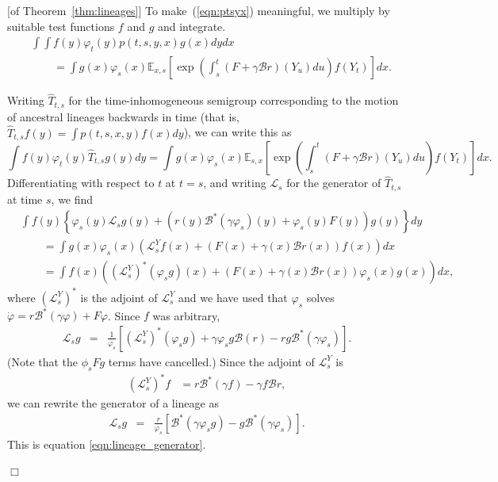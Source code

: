 \documentclass[12pt]{article}
\newenvironment {proof}{{\noindent\bf Proof }}{\hfill $\Box$ \medskip}
\def \hat{\widehat}
\newcommand{\IE}{\mathbb E}
\newcommand{\DG}{\mathcal{B}}  %
\newcommand{\Lgen}{\mathcal{L}}    %
\begin{document}
\begin{proof}[of Theorem~\ref{thm:lineages}]
To make~(\ref{eqn:ptsyx}) meaningful, we multiply by suitable test functions
$f$ and $g$ and integrate.
\begin{align*}
&\int \int f(y) \varphi_t(y) p(t,s,y,x) g(x) dy dx \\
&\qquad =
\int g(x) \varphi_s(x)
\IE_{x,s}\left[
    \exp\left(
        \int_s^t(F+\gamma\DG r)(Y_u)du
    \right)f(Y_t)
\right] dx .
\end{align*}

Writing $\hat{T}_{t,s}$ for the time-inhomogeneous semigroup
corresponding to the motion of ancestral lineages backwards in time
(that is, $\hat{T}_{t,s} f(y) = \int p(t,s,x,y) f(x) dy$),
we can write this as 
$$
    \int f(y)\varphi_t(y)\hat{T}_{t,s}g(y)dy
    =
    \int g(x) \varphi_s(x)
        \IE_{s,x} \left[
            \exp\left(
                \int_s^t(F+\gamma\DG r)(Y_u)du
            \right)f(Y_t)
        \right]dx.
$$
Differentiating with respect to $t$ at $t=s$, and writing 
$\Lgen_s$ for the generator of $\hat{T}_{t,s}$ at time $s$, we find
\begin{align*}
&
    \int f(y) \left\{
        \varphi_s(y) \Lgen_s g(y)
        + \left(
            r(y) \DG^*(\gamma \varphi_s)(y) + \varphi_s(y) F(y)
        \right) g(y)
    \right\} dy \\
&\qquad =
    \int g(x) \varphi_s(x) \left(
        {\mathcal L}^Y_s f(x) + (F(x)+\gamma(x) \DG r(x)) f(x)
    \right) dx \\
&\qquad =
    \int f(x) \left(
        ({\mathcal L}^Y_s)^* (\varphi_s g)(x) + (F(x) + \gamma(x) \DG r(x)) \varphi_s(x) g(x)
    \right) dx ,
\end{align*}
where $({\mathcal L}^Y_s)^*$ is the adjoint of ${\mathcal L}^Y_s$
and we have used that $\varphi_s$ solves $\dot \varphi = r \DG^*(\gamma \varphi) + F \varphi$.
Since $f$ was arbitrary,
\begin{eqnarray*}
\Lgen_s g
    &=&
    \frac{1}{\varphi_s} \left[
        ({\mathcal L}^Y_s)^* (\varphi_s g)
        + \gamma \varphi_s g \DG(r)
        - r g \DG^*(\gamma \varphi_s)
    \right] .
\end{eqnarray*}
(Note that the $\phi_s F g$ terms have cancelled.)
Since the adjoint of ${\mathcal L}^Y_s$ is
\begin{align*}
    ({\mathcal L}^Y_s)^* f
    &=
    r \DG^* (\gamma f) - \gamma f \DG r ,
\end{align*}
we can rewrite the generator of a lineage as 
\begin{eqnarray*}
\Lgen_s g
    &=&
    \frac{r}{\varphi_s} \left[
        \DG^* (\gamma \varphi_s g)
        - g \DG^*(\gamma \varphi_s)
    \right] .
\end{eqnarray*}
This is equation \eqref{eqn:lineage_generator}.



\end{proof}
\end{document}
